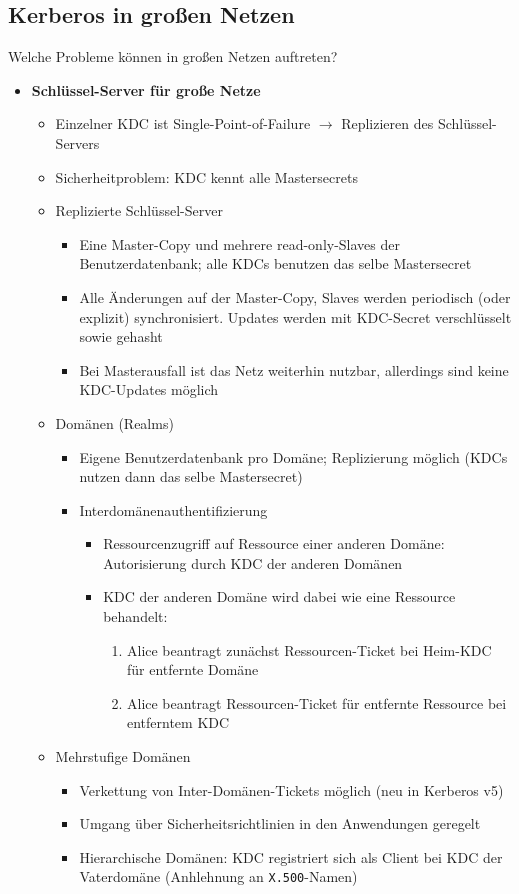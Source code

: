 \subsection{Kerberos in großen Netzen}
Welche Probleme können in großen Netzen auftreten?
\begin{itemize}
	\item \textbf{Schlüssel-Server für große Netze}
	\begin{itemize}
		\item Einzelner KDC ist Single-Point-of-Failure \(\rightarrow\) Replizieren des Schlüssel-Servers
		\item Sicherheitproblem: KDC kennt alle Mastersecrets
		\item Replizierte Schlüssel-Server
		\begin{itemize}
			\item Eine Master-Copy und mehrere read-only-Slaves der Benutzerdatenbank; alle KDCs benutzen das selbe Mastersecret
			\item Alle Änderungen auf der Master-Copy, Slaves werden periodisch (oder explizit) synchronisiert. Updates werden mit KDC-Secret verschlüsselt sowie gehasht
			\item Bei Masterausfall ist das Netz weiterhin nutzbar, allerdings sind keine KDC-Updates möglich
		\end{itemize}
		\item Domänen (Realms)
		\begin{itemize}
			\item Eigene Benutzerdatenbank pro Domäne; Replizierung möglich (KDCs nutzen dann das selbe Mastersecret)
			\item Interdomänenauthentifizierung
			\begin{itemize}
				\item Ressourcenzugriff auf Ressource einer anderen Domäne: Autorisierung durch KDC der anderen Domänen
				\item KDC der anderen Domäne wird dabei wie eine Ressource behandelt:
				\begin{enumerate}
					\item Alice beantragt zunächst Ressourcen-Ticket bei Heim-KDC für entfernte Domäne
					\item Alice beantragt Ressourcen-Ticket für entfernte Ressource bei entferntem KDC
				\end{enumerate}
			\end{itemize}
		\end{itemize}
		\item Mehrstufige Domänen
		\begin{itemize}
			\item Verkettung von Inter-Domänen-Tickets möglich (neu in Kerberos v5)
			\item Umgang über Sicherheitsrichtlinien in den Anwendungen geregelt
			\item Hierarchische Domänen: KDC registriert sich als Client bei KDC der Vaterdomäne (Anhlehnung an \texttt{X.500}-Namen)
		\end{itemize}
	\end{itemize}
\end{itemize}



